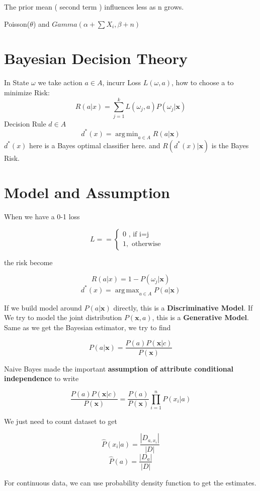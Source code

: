 \documentclass[11pt, openany]{book}              %
\DeclareMathOperator*{\argmax}{arg\,max}  %
\DeclareMathOperator*{\argmin}{arg\,min}  %
\begin{document}
The prior mean ( second term ) influences less as n grows.

Poisson($\theta$) and $Gamma(\alpha + \sum X_i, \beta + n )$ 

\section{ Bayesian Decision Theory}

In State $\omega$ we take action $a \in A$, incurr Loss $L(\omega,a)$, how to choose a to minimize
Risk:
$$R(a|x) = \sum_{j=1}^k L(\omega_j, a) P(\omega_j |\mathbf{x} )$$
Decision Rule $d \in A$
$$d^*(x) = \argmin_{a \in A} R(a|\mathbf{x})$$
$d^*(x)$ here is a Bayes optimal classifier here. and $R(d^*(x)|\mathbf{x})$ is the Bayes Risk.



\section{Model and Assumption}
When we have a 0-1 loss

$$L = = \left\{
             \begin{array}{lr}
             0 \text{ , if i=j} &  \\
             1, \text{ otherwise } &  
             \end{array}
      \right.$$

the risk become

$$R(a|x) = 1- P(\omega_j |\mathbf{x} )$$
$$d^*(x) = \argmax_{a \in A} P(a|\mathbf{x})$$

If we build model around $P(a|\mathbf{x})$ directly, this is a \textbf{Discriminative Model}. If We try to model the joint distribution $P(\mathbf{x},a)$, this is a \textbf{Generative Model}. Same as we get the Bayesian estimator, we try to find

$$P(a|\mathbf{x}) = \frac{P(a)P(\mathbf{x}|c)}{P(\mathbf{x})}$$

Naive Bayes made the important \textbf{assumption of attribute conditional independence} to write

$$\frac{P(a)P(\mathbf{x}|c)}{P(\mathbf{x})}= \frac{P(a)}{P(\mathbf{x})}\prod_{i=1}^n P(x_i|a)$$

We just need to count dataset to get

$$\hat{P}(x_i|a) = \frac{|D_{a,x_i}|}{|D|}$$
$$\hat{P}(a) = \frac{|D_{a}|}{|D|}$$

For continuous data, we can use probability density function to get the estimates. 
\end{document}

